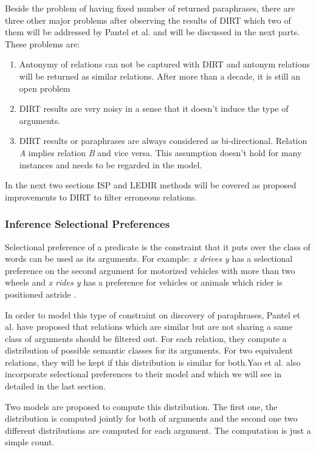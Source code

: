   Beside the problem of having fixed number of returned paraphrases, there are three other major 
  problems after observing the results of DIRT which two of them will be addressed by Pantel et al. and
  will be discussed in the next parts. These problems are:
  
  \begin{enumerate}
    \item Antonymy of relations can not be captured with DIRT and antonym relations will be returned as similar relations. After more than
    a decade, it is still an open problem
    \item DIRT results are very noisy in a sense that it doesn't induce the type of arguments.
    \item DIRT results or paraphrases are always considered as bi-directional. Relation \emph{A} implies relation \emph{B} and vice versa.
    This assumption doesn't hold for many instances and needs to be regarded in the model.
  \end{enumerate}
  
In the next two sections ISP and LEDIR methods will be covered as proposed improvements to DIRT to filter erroneous relations.
   

\subsubsection{Inference Selectional Preferences}
\label{ssec:dirt-sel-pref} 

Selectional preference of a predicate is the constraint that it puts over the class of words can be used as its arguments.
For example: \emph{x drives y} has a selectional preference on the second argument for motorized 
vehicles with more than two wheels and \emph {x rides y}
has a preference for vehicles or animals which rider is positioned astride \cite{Mechura2008} .

In order to model this type of constraint on discovery of paraphrases, Pantel et al. \cite{Pantel2007} have proposed that
relations which are similar but are not sharing a same class of arguments should be filtered out. For each relation, 
they compute a distribution of possible semantic classes for its arguments. For two equivalent relations, they will be kept
if this distribution is similar for both.Yao et al. \cite{Yao2011} also incorporate selectional preferences to their model and which we
will see in detailed in the last section.

Two models are proposed to compute this distribution. The first one, the distribution is computed jointly for both of arguments
and the second one two different distributions are computed for each argument. The computation is just a simple count.

